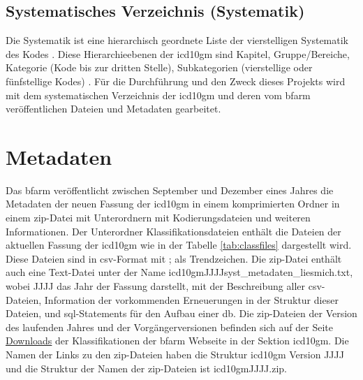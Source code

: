 \subsection{Systematisches Verzeichnis (Systematik)} 

Die Systematik ist eine hierarchisch geordnete Liste der vierstelligen Systematik des Kodes \cite{icd10syst}. Diese Hierarchieebenen der \ac{icd10gm} sind Kapitel, Gruppe/Bereiche, Kategorie (Kode bis zur dritten Stelle), Subkategorien (vierstellige oder fünfstellige Kodes) \cite{icd10systauf}. Für die Durchführung und den Zweck dieses Projekts wird mit dem systematischen Verzeichnis der \ac{icd10gm} und deren vom \ac{bfarm} veröffentlichen Dateien und Metadaten gearbeitet.

\section{Metadaten}

Das \ac{bfarm} veröffentlicht zwischen September und Dezember eines Jahres die Metadaten der neuen Fassung der \ac{icd10gm} in einem komprimierten Ordner in einem \ac{zip}-Datei mit Unterordnern  mit Kodierungsdateien und weiteren Informationen. Der Unterordner Klassifikationsdateien enthält die Dateien der aktuellen Fassung der \ac{icd10gm} wie in der Tabelle \ref{tab:classfiles} dargestellt wird. Diese Dateien sind in \ac{csv}-Format mit \glqq ;\grqq{} als Trendzeichen. Die \ac{zip}-Datei enthält auch eine Text-Datei unter der Name \textsf{icd10gmJJJJsyst\_metadaten\_liesmich.txt}, wobei \textsf{JJJJ} das Jahr der Fassung darstellt, mit der Beschreibung aller \ac{csv}-Dateien, Information der vorkommenden Erneuerungen in der Struktur dieser Dateien, und \ac{sql}-Statements für den Aufbau einer \ac{db}. Die \ac{zip}-Dateien der Version des laufenden Jahres und der Vorgängerversionen befinden sich auf der Seite \href{https://www.dimdi.de/dynamic/de/klassifikationen/downloads/}{Downloads} der Klassifikationen der \ac{bfarm} Webseite in der Sektion \ac{icd10gm}. Die Namen der Links zu den \ac{zip}-Dateien haben die Struktur \textsf{\ac{icd10gm} Version JJJJ} und die Struktur der Namen der \ac{zip}-Dateien ist \textsf{\ac{icd10gm}JJJJ.zip}.

